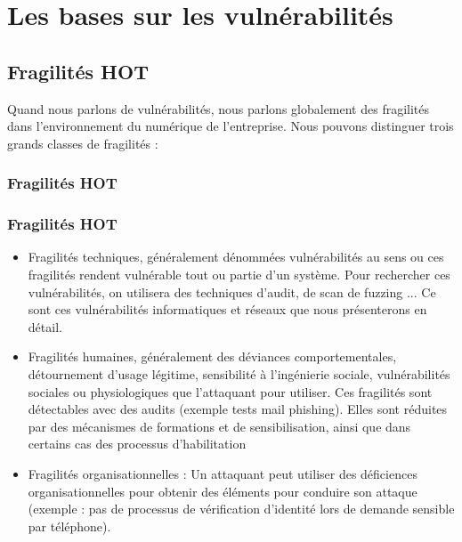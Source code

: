 \uchap{\jobname}
\section{Les bases sur les vulnérabilités}

\subsection{Fragilités HOT}

Quand nous parlons de vulnérabilités, nous parlons globalement des fragilités dans l’environnement du numérique de l’entreprise. Nous pouvons distinguer trois grands classes de fragilités :



\begin{frame}
\frametitle<presentation>{Fragilités HOT}

\end{frame}

\begin{frame}
\frametitle<presentation>{Fragilités HOT}
\begin{itemize}
\item Fragilités techniques, généralement dénommées vulnérabilités au sens ou ces fragilités rendent vulnérable tout ou partie d’un système. Pour rechercher ces vulnérabilités, on utilisera des techniques d’audit, de scan de fuzzing ... Ce sont ces vulnérabilités informatiques et réseaux que nous présenterons en détail.
\item Fragilités humaines, généralement des déviances comportementales, détournement d’usage légitime, sensibilité à l’ingénierie sociale, vulnérabilités sociales ou physiologiques que l’attaquant pour utiliser. Ces fragilités sont détectables avec des audits (exemple tests mail phishing). Elles sont réduites par des mécanismes de formations et de sensibilisation, ainsi que dans certains cas des processus d’habilitation 
\item Fragilités organisationnelles : Un attaquant peut utiliser des déficiences organisationnelles pour obtenir des éléments pour conduire son attaque (exemple : pas de processus de vérification d’identité lors de demande sensible par téléphone).
\end{itemize}
\end{frame}



